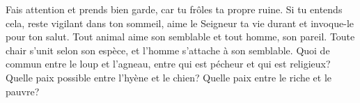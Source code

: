 Fais attention et prends bien garde, car tu frôles ta propre ruine.
Si tu entends cela, reste vigilant dans ton sommeil,
	aime le Seigneur ta vie durant et invoque-le pour ton salut.
Tout animal aime son semblable et tout homme, son pareil.
	Toute chair s’unit selon son espèce, et l’homme s’attache à son semblable.
Quoi de commun entre le loup et l’agneau,
	entre qui est pécheur et qui est religieux?
	Quelle paix possible entre l’hyène et le chien?
	Quelle paix entre le riche et le pauvre?
